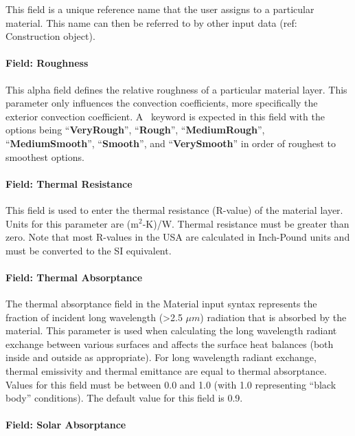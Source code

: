 This field is a unique reference name that the user assigns to a particular material. This name can then be referred to by other input data (ref: Construction object).

\paragraph{Field: Roughness}\label{field-roughness-1}

This alpha field defines the relative roughness of a particular material layer. This parameter only influences the convection coefficients, more specifically the exterior convection coefficient. A~ keyword is expected in this field with the options being ``\textbf{VeryRough}'', ``\textbf{Rough}'', ``\textbf{MediumRough}'', ``\textbf{MediumSmooth}'', ``\textbf{Smooth}'', and ``\textbf{VerySmooth}'' in order of roughest to smoothest options.

\paragraph{Field: Thermal Resistance}\label{field-thermal-resistance}

This field is used to enter the thermal resistance (R-value) of the material layer. Units for this parameter are (m\(^{2}\)-K)/W. Thermal resistance must be greater than zero. Note that most R-values in the USA are calculated in Inch-Pound units and must be converted to the SI equivalent.

\paragraph{Field: Thermal Absorptance}\label{field-thermal-absorptance-1}

The thermal absorptance field in the Material input syntax represents the fraction of incident long wavelength (>2.5 $\mu{}m$) radiation that is absorbed by the material. This parameter is used when calculating the long wavelength radiant exchange between various surfaces and affects the surface heat balances (both inside and outside as appropriate). For long wavelength radiant exchange, thermal emissivity and thermal emittance are equal to thermal absorptance. Values for this field must be between 0.0 and 1.0 (with 1.0 representing ``black body'' conditions). The default value for this field is 0.9.

\paragraph{Field: Solar Absorptance}\label{field-solar-absorptance-1}

